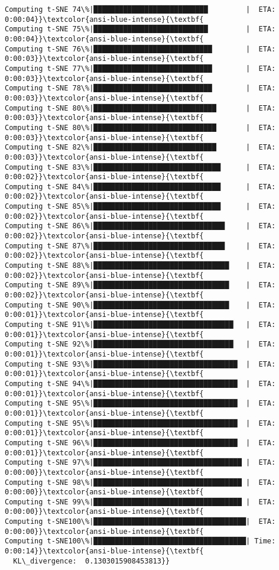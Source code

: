\documentclass[11pt]{article}
\begin{document}
\begin{Verbatim}[commandchars=\\\{\}]
Computing t-SNE 74\%|███████████████████████████         |  ETA: 0:00:04}}\textcolor{ansi-blue-intense}{\textbf{
Computing t-SNE 75\%|███████████████████████████         |  ETA: 0:00:04}}\textcolor{ansi-blue-intense}{\textbf{
Computing t-SNE 76\%|████████████████████████████        |  ETA: 0:00:03}}\textcolor{ansi-blue-intense}{\textbf{
Computing t-SNE 77\%|████████████████████████████        |  ETA: 0:00:03}}\textcolor{ansi-blue-intense}{\textbf{
Computing t-SNE 78\%|████████████████████████████        |  ETA: 0:00:03}}\textcolor{ansi-blue-intense}{\textbf{
Computing t-SNE 80\%|█████████████████████████████       |  ETA: 0:00:03}}\textcolor{ansi-blue-intense}{\textbf{
Computing t-SNE 80\%|█████████████████████████████       |  ETA: 0:00:03}}\textcolor{ansi-blue-intense}{\textbf{
Computing t-SNE 82\%|█████████████████████████████       |  ETA: 0:00:03}}\textcolor{ansi-blue-intense}{\textbf{
Computing t-SNE 83\%|██████████████████████████████      |  ETA: 0:00:02}}\textcolor{ansi-blue-intense}{\textbf{
Computing t-SNE 84\%|██████████████████████████████      |  ETA: 0:00:02}}\textcolor{ansi-blue-intense}{\textbf{
Computing t-SNE 85\%|██████████████████████████████      |  ETA: 0:00:02}}\textcolor{ansi-blue-intense}{\textbf{
Computing t-SNE 86\%|███████████████████████████████     |  ETA: 0:00:02}}\textcolor{ansi-blue-intense}{\textbf{
Computing t-SNE 87\%|███████████████████████████████     |  ETA: 0:00:02}}\textcolor{ansi-blue-intense}{\textbf{
Computing t-SNE 88\%|████████████████████████████████    |  ETA: 0:00:02}}\textcolor{ansi-blue-intense}{\textbf{
Computing t-SNE 89\%|████████████████████████████████    |  ETA: 0:00:02}}\textcolor{ansi-blue-intense}{\textbf{
Computing t-SNE 90\%|████████████████████████████████    |  ETA: 0:00:01}}\textcolor{ansi-blue-intense}{\textbf{
Computing t-SNE 91\%|█████████████████████████████████   |  ETA: 0:00:01}}\textcolor{ansi-blue-intense}{\textbf{
Computing t-SNE 92\%|█████████████████████████████████   |  ETA: 0:00:01}}\textcolor{ansi-blue-intense}{\textbf{
Computing t-SNE 93\%|██████████████████████████████████  |  ETA: 0:00:01}}\textcolor{ansi-blue-intense}{\textbf{
Computing t-SNE 94\%|██████████████████████████████████  |  ETA: 0:00:01}}\textcolor{ansi-blue-intense}{\textbf{
Computing t-SNE 95\%|██████████████████████████████████  |  ETA: 0:00:01}}\textcolor{ansi-blue-intense}{\textbf{
Computing t-SNE 95\%|██████████████████████████████████  |  ETA: 0:00:01}}\textcolor{ansi-blue-intense}{\textbf{
Computing t-SNE 96\%|██████████████████████████████████  |  ETA: 0:00:01}}\textcolor{ansi-blue-intense}{\textbf{
Computing t-SNE 97\%|███████████████████████████████████ |  ETA: 0:00:00}}\textcolor{ansi-blue-intense}{\textbf{
Computing t-SNE 98\%|███████████████████████████████████ |  ETA: 0:00:00}}\textcolor{ansi-blue-intense}{\textbf{
Computing t-SNE 99\%|███████████████████████████████████ |  ETA: 0:00:00}}\textcolor{ansi-blue-intense}{\textbf{
Computing t-SNE100\%|████████████████████████████████████|  ETA: 0:00:00}}\textcolor{ansi-blue-intense}{\textbf{
Computing t-SNE100\%|████████████████████████████████████| Time: 0:00:14}}\textcolor{ansi-blue-intense}{\textbf{
  KL\_divergence:  0.1303015908453813}}

    \end{Verbatim}
\end{document}
